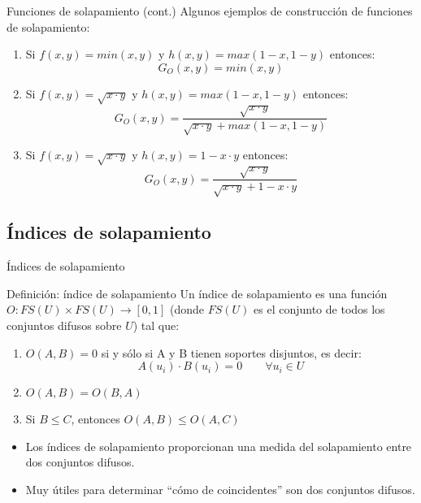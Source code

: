 \documentclass{beamer}
\begin{document}
\begin{frame}{Funciones de solapamiento (cont.)}
	Algunos ejemplos de construcción de funciones de solapamiento: 
	\vspace{0.5cm}
	\begin{enumerate}
		\item Si $f(x,y)=min(x,y)$ y $h(x,y) = max(1-x,1-y)$ entonces: 
		\begin{equation}
		G_{O}(x,y) = min(x,y)
		\end{equation}
		\item Si $f(x,y)=\sqrt{x \cdot y}$ y $h(x,y) = max(1-x,1-y)$ entonces: 
		\begin{equation}G_{O}(x,y) = \frac{\sqrt{x \cdot y}}{\sqrt{x \cdot y} + max(1-x,1-y)}
		\end{equation}
		\item Si $f(x,y)=\sqrt{x \cdot y}$ y $h(x,y) = 1 - x \cdot y $ entonces: 
		\begin{equation}G_{O}(x,y) = \frac{\sqrt{x \cdot y}}{\sqrt{x \cdot y} + 1 - x \cdot y}
		\end{equation}
	\end{enumerate}
\end{frame}
\fi

\subsection{Índices de solapamiento}
\begin{frame}{Índices de solapamiento}
	\begin{block}{Definición: índice de solapamiento}
		Un índice de solapamiento es una función $O : FS(U) \times FS(U) \rightarrow [0,1]$ (donde $FS(U)$ es el conjunto de todos los conjuntos difusos sobre $U$) tal que:
		\begin{enumerate}
		\item $O(A,B) = 0$ si y sólo si A y B tienen soportes disjuntos, es decir: 
			\begin{equation}
				A(u_{i}) \cdot B(u_{i}) = 0 \qquad \forall u_{i} \in U
			\end{equation}
		\item $O(A,B) = O(B,A)$\label{BO2}
		\item Si $B \leq C$, entonces $O(A,B) \leq O(A,C)$\label{BO3}
		\end{enumerate}
	\end{block}
	\begin{itemize}
		\item Los índices de solapamiento proporcionan una medida del solapamiento entre dos conjuntos difusos.
		\item Muy útiles para determinar ``cómo de coincidentes'' son dos conjuntos difusos.
	\end{itemize}
\end{frame}
\end{document}
